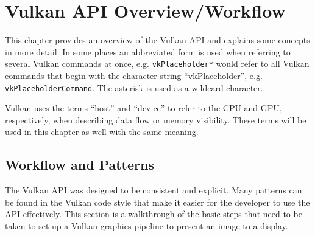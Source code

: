 
\chapter{Vulkan API Overview/Workflow}
\label{cha:VulkanOverview}

  This chapter provides an overview of the Vulkan API and explains some concepts in more detail. In some places an abbreviated form is used when referring to several Vulkan commands at once, e.g. \lstinline{vkPlaceholder*} would refer to all Vulkan commands that begin with the character string ``vkPlaceholder'', e.g. \lstinline{vkPlaceholderCommand}. The asterisk is used as a wildcard character.

  Vulkan uses the terms ``host'' and ``device'' to refer to the CPU and GPU, respectively, when describing data flow or memory visibility. These terms will be used in this chapter as well with the same meaning.

  \section{Workflow and Patterns}
  \label{sec:WorkflowAndPatterns}
    The Vulkan API was designed to be consistent and explicit. Many patterns can be found in the Vulkan code style that make it easier for the developer to use the API effectively. This section is a walkthrough of the basic steps that need to be taken to set up a Vulkan graphics pipeline to present an image to a display.

